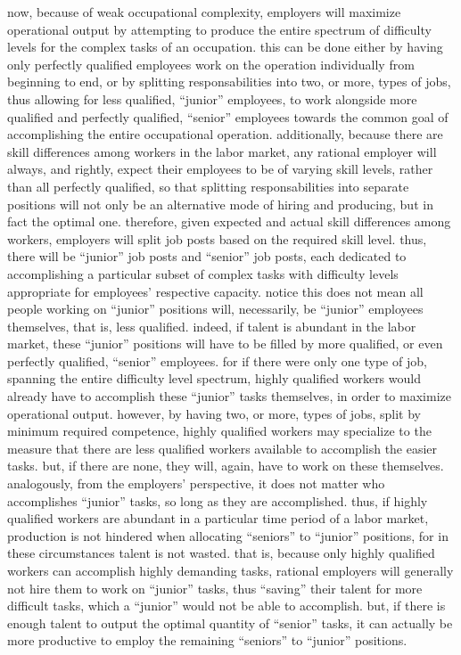 \documentclass[hidelinks, nonatbib]{elsarticle}
\begin{document}
now, because of weak occupational complexity, employers will maximize operational output by attempting to produce the entire spectrum of difficulty levels for the complex tasks of an occupation.
this can be done either by having only perfectly qualified employees work on the operation individually from beginning to end, or by splitting responsabilities into two, or more, types of jobs, thus allowing for less qualified, ``junior'' employees, to work alongside more qualified and perfectly qualified, ``senior'' employees towards the common goal of accomplishing the entire occupational operation.
additionally, because there are skill differences among workers in the labor market, any rational employer will always, and rightly, expect their employees to be of varying skill levels, rather than all perfectly qualified, so that splitting responsabilities into separate positions will not only be an alternative mode of hiring and producing, but in fact the optimal one.
therefore, given expected and actual skill differences among workers, employers will split job posts based on the required skill level. thus, there will be ``junior'' job posts and ``senior'' job posts, each dedicated to accomplishing a particular subset of complex tasks with difficulty levels appropriate for employees' respective capacity.
notice this does not mean all people working on ``junior'' positions will, necessarily, be ``junior'' employees themselves, that is, less qualified. indeed, if talent is abundant in the labor market, these ``junior'' positions will have to be filled by more qualified, or even perfectly qualified, ``senior'' employees. for if there were only one type of job, spanning the entire difficulty level spectrum, highly qualified workers would already have to accomplish these ``junior'' tasks themselves, in order to maximize operational output. however, by having two, or more, types of jobs, split by minimum required competence, highly qualified workers may specialize to the measure that there are less qualified workers available to accomplish the easier tasks. but, if there are none, they will, again, have to work on these themselves.
analogously, from the employers' perspective, it does not matter who accomplishes ``junior'' tasks, so long as they are accomplished. thus, if highly qualified workers are abundant in a particular time period of a labor market, production is not hindered when allocating ``seniors'' to ``junior'' positions, for in these circumstances talent is not wasted. that is, because only highly qualified workers can accomplish highly demanding tasks, rational employers will generally not hire them to work on ``junior'' tasks, thus ``saving'' their talent for more difficult tasks, which a ``junior'' would not be able to accomplish. but, if there is enough talent to output the optimal quantity of ``senior'' tasks, it can actually be more productive to employ the remaining ``seniors'' to ``junior'' positions.
\end{document}
